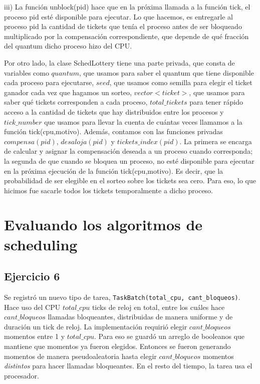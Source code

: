 \documentclass[11pt, a4paper, twoside]{article}
\begin{document}
iii) La función unblock(pid) hace que en la próxima llamada a la función tick, el proceso pid 
esté disponible para ejecutar. Lo que hacemos, es entregarle al proceso pid la cantidad de tickets
que tenía el proceso antes de ser bloqueado multiplicado por la compensación correspondiente, que 
depende de qué fracción del quantum dicho proceso hizo del CPU. 

Por otro lado, la clase SchedLottery tiene una parte privada, que consta de variables como $quantum$, 
que usamos para saber el quantum que tiene disponible cada proceso para ejecutarse, $seed$, que
usamos como semilla para elegir el ticket ganador cada vez que hagamos un sorteo, $vector<ticket>$, que
usamos para saber qué tickets corresponden a cada proceso, $total\_tickets$ para tener rápido acceso
a la cantidad de tickets que hay distribuidos entre los procesos y $tick\_number$ que usamos para 
llevar la cuenta de cuántas veces llamamos a la función tick(cpu,motivo). Además, contamos con 
las funciones privadas $compensa(pid)$, $desaloja(pid)$ y $tickets\_index(pid)$. La primera se encarga de
calcular y asignar la compensación deseada a un proceso cuando corresponda; la segunda de que cuando
se bloquea un proceso, no esté disponible para ejecutar en la próxima ejecución de la función
tick(cpu,motivo). Es decir, que la probabilidad de ser elegible en el sorteo sobre los tickets sea cero.
Para eso, lo que hicimos fue sacarle todos los tickets temporalmente a dicho proceso. 






\clearpage
{}
\section{Evaluando los algoritmos de scheduling}
\setcounter{subsection}{5}






\subsection{Ejercicio 6}

Se registró un nuevo tipo de tarea, \texttt{TaskBatch(total\_cpu, cant\_bloqueos)}. Hace uso del CPU $total\_cpu$ ticks de reloj en total, entre los cuáles hace $cant\_bloqueos$ llamadas bloqueantes, distribuidas de manera uniforme y de duración un tick de reloj.
La implementación requirió elegir $cant\_bloqueos$ momentos entre 1 y $total\_cpu$. Para eso se guardó un arreglo de booleanos que mantiene que momentos ya fueron elegidos. Entonces se fueron generando momentos de manera pseudo\-aleatoria hasta elegir $cant\_bloqueos$ momentos \textit{distintos} para hacer llamadas bloqueantes. En el resto del tiempo, la tarea usa el procesador.
\end{document}
